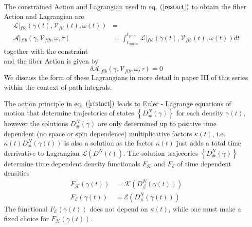 \documentclass[aps,preprint]{revtex4}%
\begin{document}
The constrained Action and Lagrangian used in eq. $\left(  \ref{restact}%
\right)  $ to obtain the fiber Action and Lagrangian are
\begin{align}
\mathcal{L}\left|  _{fib}\left(  \gamma\left(  t\right)  ,\mathcal{V}%
_{fib}\left(  t\right)  ,\omega\left(  t\right)  \right)  \right.   &
=\nonumber\\
\mathcal{A}\left|  _{fib}\left(  \gamma,\mathcal{V}_{fib},\omega,\tau\right)
\right.   &  =\int_{t_{initial}}^{t_{final}}\mathcal{L}\left|  _{fib}\left(
\gamma\left(  t\right)  ,\mathcal{V}_{fib}\left(  t\right)  ,\omega\left(
t\right)  \right)  \right.  dt
\end{align}
together with the constraint
\begin{equation}
\end{equation}
and the fiber Action is given by
\begin{equation}
\delta\mathcal{A}\left|  _{fib}\left(  \gamma,\mathcal{V}_{fib},\omega
,\tau\right)  \right.  =0
\end{equation}
We discuss the form of these Lagrangians in more detail in paper III of this
series within the context of path integrals.

The action principle in eq. $\left(  \ref{restact}\right)  $ leads to Euler -
Lagrange equations of motion that determine trajectories of states $\left\{
D_{\#}^{N}\left(  \gamma\right)  \right\}  $ for each density $\gamma\left(
t\right)  $, however the solutions $D_{\#}^{N}\left(  \gamma\right)  $ are
only determined up to positive time dependent (no space or spin dependence)
multiplicative factors $\kappa\left(  t\right)  $, i.e. $\kappa\left(
t\right)  D_{\#}^{N}\left(  \gamma\left(  t\right)  \right)  $ is also a
solution as the factor $\kappa\left(  t\right)  $ just adds a total time
derrivative to Lagrangian $\mathcal{L}\left(  D^{N}\left(  t\right)  \right)
$. The solution trajecories $\left\{  D_{\#}^{N}\left(  \gamma\right)
\right\}  $ determine time dependent density functionals $F_{\mathcal{K}}$ and
$F_{\mathcal{E}} $ of time dependent densities
\begin{align}
F_{\mathcal{K}}\left(  \gamma\left(  t\right)  \right)   &  =\mathcal{K}%
\left(  D_{\#}^{N}\left(  \gamma\left(  t\right)  \right)  \right) \nonumber\\
F_{\mathcal{E}}\left(  \gamma\left(  t\right)  \right)   &  =\mathcal{E}%
\left(  D_{\#}^{N}\left(  \gamma\left(  t\right)  \right)  \right)
\end{align}
The functional $F_{\mathcal{E}}\left(  \gamma\left(  t\right)  \right)  $ does
not depend on $\kappa\left(  t\right)  $, while one must make a fixed choice
for $F_{\mathcal{K}}\left(  \gamma\left(  t\right)  \right)  $.
\end{document}
